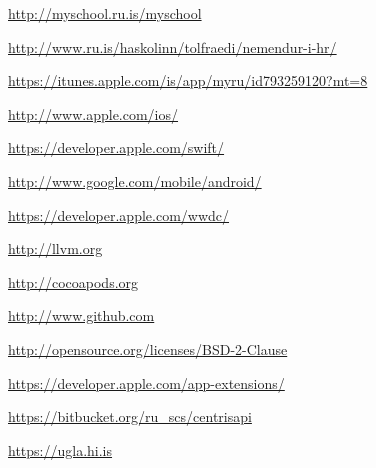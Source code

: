 \documentclass[pdftex, DIV=calc, paper=a4, fontsize=11pt]{scrartcl}	 %
\begin{document}
\begin{thebibliography}{9}

    \url{http://myschool.ru.is/myschool}

    \url{http://www.ru.is/haskolinn/tolfraedi/nemendur-i-hr/}

    \url{https://itunes.apple.com/is/app/myru/id793259120?mt=8}

    \url{http://www.apple.com/ios/}

    \url{https://developer.apple.com/swift/}

    \url{http://www.google.com/mobile/android/}
    
    \url{https://developer.apple.com/wwdc/}

    \url{http://llvm.org}

    \url{http://cocoapods.org}

    \url{http://www.github.com}

    \url{http://opensource.org/licenses/BSD-2-Clause}

    \url{https://developer.apple.com/app-extensions/}

    \url{https://bitbucket.org/ru_scs/centrisapi}

    \url{https://ugla.hi.is}

\end{thebibliography}

\end{document}
